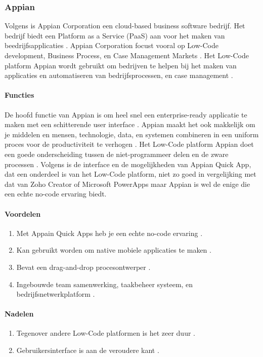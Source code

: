 \subsubsection*{Appian}
Volgens \textcite{Shala} is Appian Corporation een cloud-based business software bedrijf. Het bedrijf biedt een Platform as a Service (PaaS) aan voor het maken van beedrijfsapplicaties \autocite{Shala}.
Appian Corporation focust vooral op Low-Code development, Business Process, en Case Management Markets \autocite{Shala}. Het Low-Code platform Appian wordt gebruikt om bedrijven te helpen
bij het maken van applicaties en automatiseren van bedrijfsprocessen, en case management \autocite{Shala}.
\paragraph{Functies}
De hoofd functie van Appian is om heel snel een enterprise-ready applicatie te maken met een schitterende user interface \autocite{Shala}. Appian maakt het ook makkelijk 
om je middelen en mensen, technologie, data, en systemen combineren in een uniform proces voor de productiviteit te verhogen \autocite{Shala}.
Het Low-Code platform Appian doet een goede onderscheiding tussen de niet-programmeer delen en de zware processen \autocite{Marvin2017}.
Volgens \textcite{Marvin2017} is de interface en de mogelijkheden van Appian Quick App, dat een onderdeel is van het Low-Code platform, niet zo goed in vergelijking met dat van Zoho Creator of Microsoft PowerApps maar Appian is wel de enige die een echte no-code ervaring biedt.

\paragraph*{Voordelen}
\begin{enumerate}
    \item Met Appain Quick Apps heb je een echte no-code ervaring \autocite{Marvin2017}.
    \item Kan gebruikt worden om native mobiele applicaties te maken \autocite{Marvin2017}.
    \item Bevat een drag-and-drop procesontwerper \autocite{Marvin2017}.
    \item Ingebouwde team samenwerking, taakbeheer systeem, en bedrijfsnetwerkplatform \autocite{Marvin2017}.
\end{enumerate}


\paragraph*{Nadelen}
\begin{enumerate}
    \item Tegenover andere Low-Code platformen is het zeer duur \autocite{Marvin2017}.
    \item Gebruikersinterface is aan de veroudere kant \autocite{Marvin2017}.
\end{enumerate}

